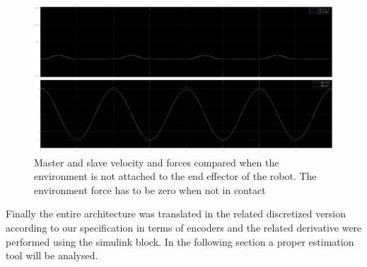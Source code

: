 \documentclass[a4paper,12pt]{article}
\begin{document}
\begin{figure}[H]
    \begin{center}
        \hspace*{-2cm}
        \includegraphics[scale=0.39]{images/hw1_forces.eps}
    \end{center}
    \caption{Master and slave velocity and forces compared when the environment is not attached to the end effector of the robot. The environment force has to be zero when not in contact}
    \label{fig:hw1_forces}
\end{figure}

\noindent Finally the entire architecture was translated in the related discretized version according to our specification in terms of encoders and the related derivative were performed using the simulink block. In the following section a proper estimation tool will be analysed.
    
\end{document}
